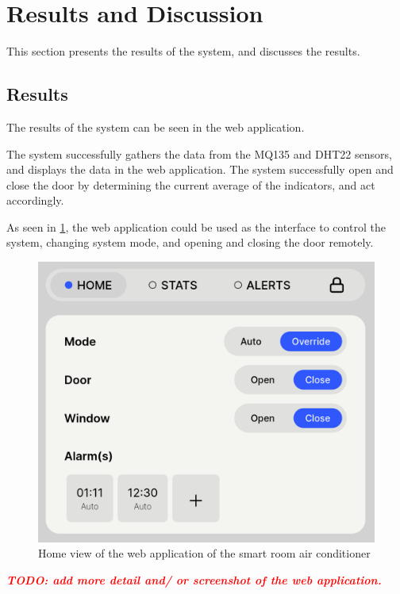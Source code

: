 \section{Results and Discussion}
This section presents the results of the system,
and discusses the results.

\subsection{Results}
The results of the system can be seen in the web
application.

The system successfully gathers the data from the
MQ135 and DHT22 sensors, and displays the data in
the web application.
The system successfully open and close the door by
determining the current average of the indicators,
and act accordingly.

As seen in \ref{webapp-home-view}, the web application
could be used as the interface to control the system,
changing system mode, and opening and closing the door
remotely.

\begin{figure}
      \centerline{\includegraphics[scale=0.2]{resources/webapp-home-view.png}}
      \caption{Home view of the web application of the smart room air conditioner}
      \label{webapp-home-view}
\end{figure}

\textcolor{red}{
      \textbf{
            \emph{TODO: add more detail and/
                  or screenshot of the web application.}
      }
}

